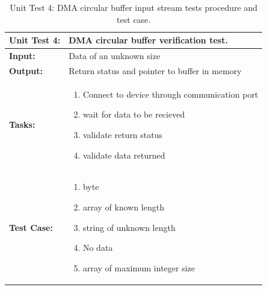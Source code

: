 \begin{table}[H]
    \centering
    \caption{Unit Test 4: DMA circular buffer input stream tests procedure and test case.}
    \begin{tabular}{|m{}|m{}|}
    \hline
       \textbf{Unit Test 4: }  &  DMA circular buffer verification test.\\
       \hline
        \textbf{Input: } &  Data of an unknown size\\
        \hline
        \textbf{Output: } & Return status and pointer to buffer in memory\\
        \hline
        \textbf{Tasks: } & \begin{enumerate}
        \vspace{1mm}
            \item Connect to device through communication port
            \item wait for data to be recieved
            \item validate return status
            \item validate data returned
            
        \end{enumerate}\\
        \hline
        \textbf{Test Case: } & \begin{enumerate}
            \vspace{1mm}
            \item byte
            \item array of known length
            \item string of unknown length
            \item No data 
            \item array of maximum integer size
        \end{enumerate}\\
        \hline
    \end{tabular}

    \label{tab:UT004}
\end{table}

